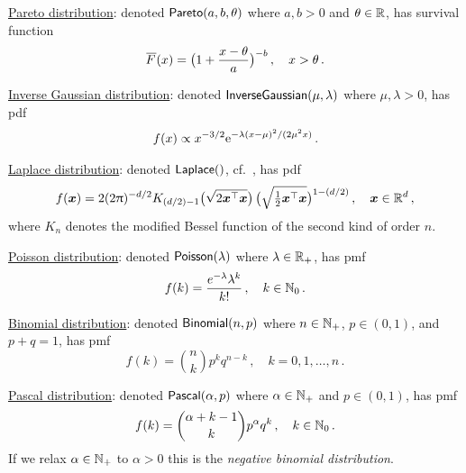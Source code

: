 \underline{Pareto distribution}: denoted $\mathsf{Pareto}(a, b, \theta)$ where $a,b>0$ and $\theta \in \mathbb{R}$, has survival function
\[ \Ftail(x) = \bigl( 1 + \frac{x-\theta}{a} \bigr)^{-b} \,, \quad x > \theta \,. \]

\underline{Inverse Gaussian distribution}: denoted $\mathsf{InverseGaussian}(\mu,\lambda)$ where $\mu, \lambda > 0$, has pdf
\[ f(x) \propto x^{-3/2} \mathrm{e}^{-\lambda(x-\mu)^2/(2\mu^2x)}  \,. \]

\underline{Laplace distribution}: denoted $\mathsf{Laplace}()$, cf.\ \cite{eltoft2006multivariate,kotz2001asymmetric}, has pdf
\[
f(\bm{x}) = 2 (2 \uppi)^{-d/2}  K_{(d/2) -1} \bigl( \sqrt{2 \bm{x}^\top \bm{x}} \bigr) \,
 \bigl(\sqrt{\tfrac{1}{2} \bm{x}^\top \bm{x}}\bigr)^{1-(d/2)} \,, \quad \bm{x} \in \mathbb{R}^d \,,
\]
where $K_n$ denotes the modified Bessel function of the second kind of order $n$.

\underline{Poisson distribution}: denoted $\mathsf{Poisson}(\lambda)$ where $\lambda \in \mathbb{R}_+$, has pmf
\[ f(k) = \frac{e^{-\lambda}\lambda^{k}}{k!} \,, \quad k \in \mathbb{N}_0 \,. \]

\underline{Binomial distribution}: denoted $\mathsf{Binomial}(n,p)$ where $n \in \mathbb{N}_+$, $p \in (0,1)$, and $p+q=1$, has pmf
 \[ f(k) = \binom{n}{k} p^k q^{n-k} \,, \quad k = 0,1,\dots, n\,. \]

\underline{Pascal distribution}: denoted $\mathsf{Pascal}(\alpha,p)$ where $\alpha \in \mathbb{N}_+$ and $p \in (0,1)$, has pmf
\[ f(k) = \binom{\alpha+k-1}{k} p^\alpha q^k \,, \quad k \in \mathbb{N}_0 \,. \]
If we relax $\alpha \in \mathbb{N}_+$ to $\alpha > 0$ this is the \emph{negative binomial distribution}.

